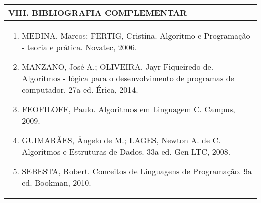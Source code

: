 \documentclass[12pt]{article}
\begin{document}

\begin{longtable}{|L{1.025\textwidth}|} \hline
%
{\bf VIII. BIBLIOGRAFIA COMPLEMENTAR} \\ \hline
\begin{enumerate}
\item MEDINA, Marcos; FERTIG, Cristina. Algoritmo e Programação - teoria e prática. Novatec, 2006. 
\item MANZANO, José A.; OLIVEIRA, Jayr Fiqueiredo de. Algoritmos - lógica para o desenvolvimento de programas de computador. 27a ed. Érica, 2014. 
\item FEOFILOFF, Paulo. Algoritmos em Linguagem C. Campus, 2009. 
\item GUIMARÃES, Ângelo de M.; LAGES, Newton A. de C. Algoritmos e Estruturas de Dados. 33a ed. Gen LTC, 2008. 
\item SEBESTA, Robert. Conceitos de Linguagens de Programação. 9a ed. Bookman, 2010.
\end{enumerate}
 \\ \hline
\end{longtable}



\end{document}
